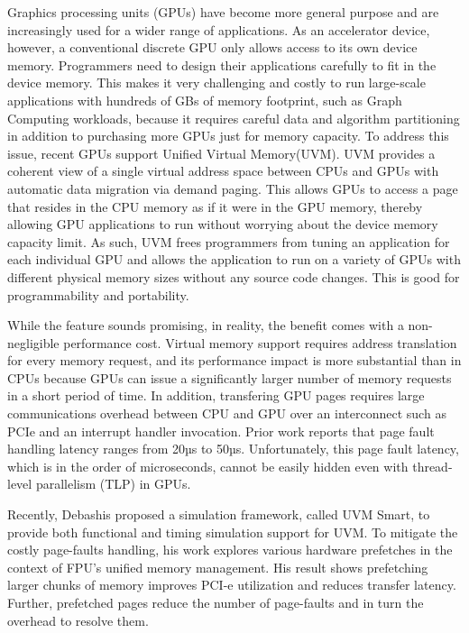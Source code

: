 Graphics processing units (GPUs) have become more general purpose and are increasingly used for a wider range of applications. As an accelerator device, however, a conventional discrete GPU only allows access to its own device memory. Programmers need to design their applications carefully to fit in the device memory. This makes it very challenging and costly to run large-scale applications with hundreds of GBs of memory footprint, such as Graph Computing workloads, because it requires careful data and algorithm partitioning in addition to purchasing more GPUs just for memory capacity. To address this issue, recent GPUs support Unified Virtual Memory(UVM). UVM provides a coherent view of a single virtual address space between CPUs and GPUs with automatic data migration via demand paging. This allows GPUs to access a page that resides in the CPU memory as if it were in the GPU memory, thereby allowing GPU applications to run without worrying about the device memory capacity limit. As such, UVM frees programmers from tuning an application for each individual GPU and allows the application to run on a variety of GPUs with different physical memory sizes without any source code changes. This is good for programmability and portability.

While the feature sounds promising, in reality, the benefit comes with a non-negligible performance cost. Virtual memory support requires address translation for every memory request, and its performance impact is more substantial than in CPUs because GPUs can issue a significantly larger number of memory requests in a short period of time. In addition, transfering GPU pages requires large communications overhead between CPU and GPU over an interconnect such as PCIe and an interrupt handler invocation. Prior work reports that page fault handling latency ranges from 20µs to 50µs. Unfortunately, this page fault latency, which is in the order of microseconds, cannot be easily hidden even with  thread-level parallelism (TLP) in GPUs.

Recently, Debashis proposed a simulation framework, called UVM Smart, to provide both functional and timing simulation support for UVM. To mitigate the costly page-faults handling, his work explores various hardware prefetches in the context of FPU's unified memory management. His result shows prefetching larger chunks of memory improves PCI-e utilization and reduces transfer latency. Further, prefetched pages reduce the number of page-faults and in turn the overhead to resolve them.